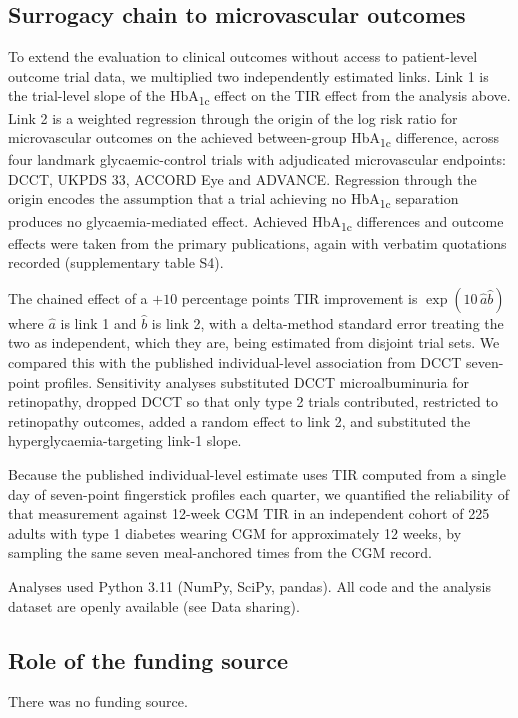 \documentclass[11pt,a4paper]{article}
\newcommand{\pp}{percentage points}
\begin{document}
\subsection{Surrogacy chain to microvascular outcomes}
To extend the evaluation to clinical outcomes without access to patient-level outcome trial data, we
multiplied two independently estimated links. Link 1 is the trial-level slope of the HbA\textsubscript{1c}
effect on the TIR effect from the analysis above. Link 2 is a weighted regression through the origin of the
log risk ratio for microvascular outcomes on the achieved between-group HbA\textsubscript{1c} difference,
across four landmark glycaemic-control trials with adjudicated microvascular endpoints:
DCCT,\citep{dcct1993,edic2000} UKPDS 33,\citep{ukpds33} ACCORD Eye\citep{accord2008,accordeye2010} and
ADVANCE.\citep{advance2008} Regression through the origin encodes the assumption that a trial achieving no
HbA\textsubscript{1c} separation produces no glycaemia-mediated effect. Achieved HbA\textsubscript{1c}
differences and outcome effects were taken from the primary publications, again with verbatim quotations
recorded (supplementary table S4).

The chained effect of a $+10$ \pp{} TIR improvement is $\exp(10\,\hat{a}\hat{b})$ where $\hat{a}$ is link 1
and $\hat{b}$ is link 2, with a delta-method standard error treating the two as independent, which they are,
being estimated from disjoint trial sets. We compared this with the published individual-level association
from DCCT seven-point profiles. Sensitivity analyses substituted DCCT microalbuminuria for retinopathy,
dropped DCCT so that only type 2 trials contributed, restricted to retinopathy outcomes, added a random
effect to link 2, and substituted the hyperglycaemia-targeting link-1 slope.

Because the published individual-level estimate uses TIR computed from a single day of seven-point
fingerstick profiles each quarter, we quantified the reliability of that measurement against 12-week CGM TIR
in an independent cohort of 225 adults with type 1 diabetes wearing CGM for approximately 12 weeks, by
sampling the same seven meal-anchored times from the CGM record.

Analyses used Python 3.11 (NumPy, SciPy, pandas). All code and the analysis dataset are openly available
(see Data sharing).

\subsection{Role of the funding source}
There was no funding source.
\end{document}
